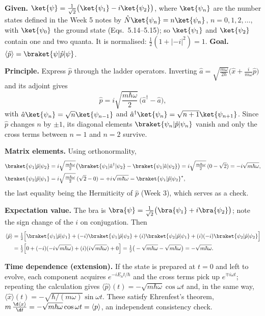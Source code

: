 \begin{solutionbox}
\textbf{Given.} $\ket{\psi}=\frac{1}{\sqrt2}\big(\ket{\psi_1}-i\ket{\psi_2}\big)$, where $\ket{\psi_n}$ are the number states defined in the Week 5 notes by $\hat N\ket{\psi_n}=n\ket{\psi_n}$, $n=0,1,2,\dots$, with $\ket{\psi_0}$ the ground state (Eqs.~5.14--5.15); so $\ket{\psi_1}$ and $\ket{\psi_2}$ contain one and two quanta. It is normalised: $\frac12(1+|{-i}|^2)=1$. \textbf{Goal.} $\langle\hat p\rangle=\braket{\psi|\hat p|\psi}$.

\textbf{Principle.} Express $\hat p$ through the ladder operators. Inverting $\hat a=\sqrt{\frac{m\omega}{2\hbar}}\big(\hat x+\frac{i}{m\omega}\hat p\big)$ and its adjoint gives
\[
\hat p=i\sqrt{\frac{m\hbar\omega}{2}}\,\big(\hat a^\dagger-\hat a\big),
\]
with $\hat a\ket{\psi_n}=\sqrt n\ket{\psi_{n-1}}$ and $\hat a^\dagger\ket{\psi_n}=\sqrt{n+1}\ket{\psi_{n+1}}$. Since $\hat p$ changes $n$ by $\pm1$, its diagonal elements $\braket{\psi_n|\hat p|\psi_n}$ vanish and only the cross terms between $n=1$ and $n=2$ survive.

\textbf{Matrix elements.} Using orthonormality,
\begin{align*}
\braket{\psi_1|\hat p|\psi_2}&=i\sqrt{\tfrac{m\hbar\omega}{2}}\big(\braket{\psi_1|\hat a^\dagger|\psi_2}-\braket{\psi_1|\hat a|\psi_2}\big)=i\sqrt{\tfrac{m\hbar\omega}{2}}\,(0-\sqrt2)=-i\sqrt{m\hbar\omega},\\
\braket{\psi_2|\hat p|\psi_1}&=i\sqrt{\tfrac{m\hbar\omega}{2}}\,(\sqrt2-0)=+i\sqrt{m\hbar\omega}=\braket{\psi_1|\hat p|\psi_2}^*,
\end{align*}
the last equality being the Hermiticity of $\hat p$ (Week 3), which serves as a check.

\textbf{Expectation value.} The bra is $\bra{\psi}=\frac{1}{\sqrt2}\big(\bra{\psi_1}+i\bra{\psi_2}\big)$; note the sign change of the $i$ on conjugation. Then
\begin{align*}
\langle\hat p\rangle
&=\tfrac12\Big[\braket{\psi_1|\hat p|\psi_1}+(-i)\braket{\psi_1|\hat p|\psi_2}+(i)\braket{\psi_2|\hat p|\psi_1}+(i)(-i)\braket{\psi_2|\hat p|\psi_2}\Big]\\
&=\tfrac12\Big[0+(-i)(-i\sqrt{m\hbar\omega})+(i)(i\sqrt{m\hbar\omega})+0\Big]
=\tfrac12\big(-\sqrt{m\hbar\omega}-\sqrt{m\hbar\omega}\big)=-\sqrt{m\hbar\omega}.
\end{align*}

\textbf{Time dependence (extension).} If the state is prepared at $t=0$ and left to evolve, each component acquires $e^{-iE_nt/\hbar}$ and the cross terms pick up $e^{\mp i\omega t}$; repeating the calculation gives $\langle\hat p\rangle(t)=-\sqrt{m\hbar\omega}\cos\omega t$ and, in the same way, $\langle\hat x\rangle(t)=-\sqrt{\hbar/(m\omega)}\sin\omega t$. These satisfy Ehrenfest's theorem, $m\,\frac{\d\langle x\rangle}{\d t}=-\sqrt{m\hbar\omega}\cos\omega t=\langle p\rangle$, an independent consistency check.


\end{solutionbox}
